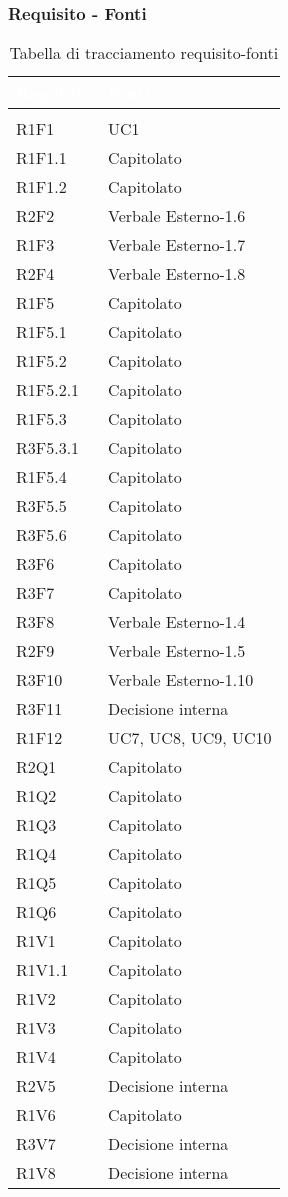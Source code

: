 \subsubsection{Requisito - Fonti}
\renewcommand{\arraystretch}{1.5}
\begin{center}
\begin{longtable}{C{6cm} C{6cm}}
		\textcolor{white}{\textbf{Requisito}} & 
		\textcolor{white}{\textbf{Fonti}}\\
		\endfirsthead
	    \\
	    \endfoot
	    \caption{Tabella di tracciamento requisito-fonti}
	    \endlastfoot

R1F1 & UC1 \\
R1F1.1 & Capitolato \\
R1F1.2 & Capitolato \\
R2F2 & Verbale Esterno-1.6 \\
R1F3 & Verbale Esterno-1.7 \\
R2F4 & Verbale Esterno-1.8 \\
R1F5 & Capitolato \\
R1F5.1 & Capitolato \\
R1F5.2 & Capitolato \\
R1F5.2.1 & Capitolato \\
R1F5.3 & Capitolato \\
R3F5.3.1 & Capitolato \\
R1F5.4 & Capitolato \\
R3F5.5 & Capitolato \\
R3F5.6 & Capitolato \\
R3F6 & Capitolato \\
R3F7 & Capitolato \\
R3F8 & Verbale Esterno-1.4 \\
R2F9 & Verbale Esterno-1.5 \\
R3F10 & Verbale Esterno-1.10 \\
R3F11 & Decisione interna \\
R1F12 & UC7, UC8, UC9, UC10 \\
R2Q1 & Capitolato \\
R1Q2 & Capitolato \\
R1Q3 & Capitolato \\
R1Q4 & Capitolato \\
R1Q5 & Capitolato \\
R1Q6 & Capitolato \\
R1V1 & Capitolato \\
R1V1.1 & Capitolato \\
R1V2 & Capitolato \\
R1V3 & Capitolato \\
R1V4 & Capitolato \\
R2V5 & Decisione interna \\
R1V6 & Capitolato \\
R3V7 & Decisione interna \\
R1V8 & Decisione interna \\

\end{longtable}
\end{center}